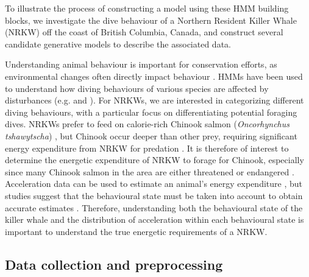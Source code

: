

To illustrate the process of constructing a model using these HMM building blocks, we investigate the dive behaviour of a Northern Resident Killer Whale (NRKW) off the coast of British Columbia, Canada, and construct several candidate generative models to describe the associated data.

Understanding animal behaviour is important for conservation efforts, as environmental changes often directly impact behaviour \citep{Sutherland:1998}. HMMs have been used to understand how diving behaviours of various species are affected by disturbances (e.g. \citep{DeRuiter:2017} and \citep{Isojunno:2017}). For NRKWs, we are interested in categorizing different diving behaviours, with a particular focus on differentiating potential foraging dives. NRKWs prefer to feed on calorie-rich Chinook salmon (\textit{Oncorhynchus tshawytscha}) \citep{Ford:2006}, but Chinook occur deeper than other prey, requiring significant energy expenditure from NRKW for predation \citep{Williams:2009,Noren:2011}. It is therefore of interest to determine the energetic expenditure of NRKW to forage for Chinook, especially since many Chinook salmon in the area are either threatened or endangered \citep{Ford:2015}. Acceleration data can be used to estimate an animal's energy expenditure \citep{Green:2009,Wilson:2019}, but studies suggest that the behavioural state must be taken into account to obtain accurate estimates \citep{Dot:2016}. Therefore, understanding both the behavioural state of the killer whale and the distribution of acceleration within each behavioural state is important to understand the true energetic requirements of a NRKW.

\subsection{Data collection and preprocessing}

